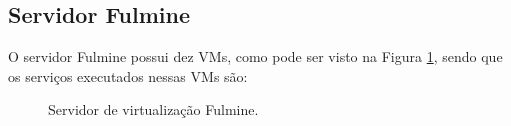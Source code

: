 \subsection{Servidor Fulmine}
\label{section:serv_fulmine}

O servidor Fulmine possui dez \ac{VM}s, como pode ser visto na Figura \ref{fig:servidor_fulmine}, sendo que os serviços executados nessas \ac{VM}s
são:

\begin{figure}[h!]
 \centering
 \caption{Servidor de virtualização Fulmine.}
 \label{fig:servidor_fulmine}
\end{figure}

